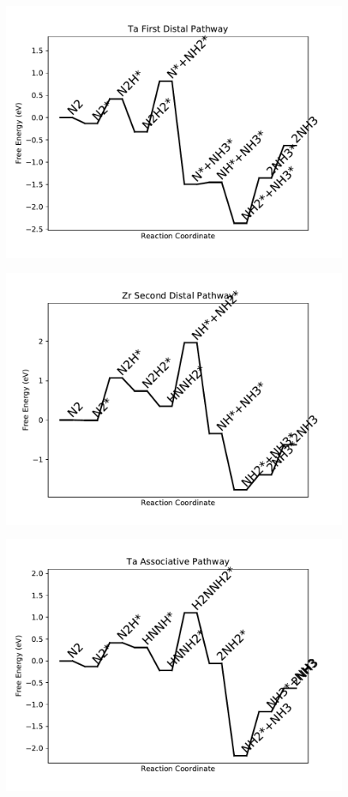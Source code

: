 \begin{figure}
\includegraphics[width=0.8\linewidth]{data/plots/Ta_distal_1.pdf}
\end{figure}

\begin{figure}
\includegraphics[width=0.8\linewidth]{data/plots/Zr_distal_2.pdf}
\end{figure}

\begin{figure}
\includegraphics[width=0.8\linewidth]{data/plots/Ta_associative.pdf}
\end{figure}


